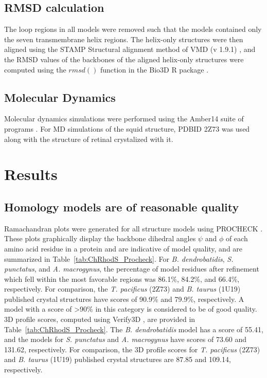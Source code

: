 \subsection*{RMSD calculation}
The loop regions in all models were removed such that the models contained only the seven transmembrane helix regions. The helix-only structures were then aligned using the STAMP Structural alignment method \cite{Russell1992} of VMD (v 1.9.1) \cite{Humphrey1996}, and the RMSD values of the backbones of the aligned helix-only structures were computed using the $rmsd()$ function in the Bio3D R package \cite{Grant2006}.\\
\subsection*{Molecular Dynamics}
Molecular dynamics simulations were performed using the Amber14 suite of programs \cite{AMBER2015}. For MD simulations of the squid structure, PDBID 2Z73 was used along with the structure of retinal crystalized with it. \\
\section{Results}
\subsection*{Homology models are of reasonable quality}
Ramachandran plots were generated for all structure models using PROCHECK \cite{Laskowski1993,Wiederstein2007}. These plots graphically display the backbone dihedral angles $\psi$ and $\phi$ of each amino acid residue in a protein and are indicative of model quality, and are summarized in Table~\ref{tab:ChRhodS_Procheck}. For \textit{B. dendrobatidis}, \textit{S. punctatus}, and \textit{A. macrogynus}, the percentage of model residues after refinement which fell within the most favorable regions was 86.1\%, 84.2\%, and 66.4\%, respectively. For comparison, the \textit{T. pacificus} (2Z73) and \textit{B. taurus} (1U19) published crystal structures have scores of 90.9\% and 79.9\%, respectively. A model with a score of \textgreater 90\% in this category is considered to be of good quality.\\
\indent 3D profile scores, computed using Verify3D \cite{Luthy1992}, are provided in Table~\ref{tab:ChRhodS_Procheck}. The \textit{B. dendrobatidis} model has a score of 55.41, and the models for \textit{S. punctatus} and \textit{A. macrogynus} have scores of 73.60 and 131.62, respectively. For comparison, the 3D profile scores for \textit{T. pacificus} (2Z73) and \textit{B. taurus} (1U19) published crystal structures are 87.85 and 109.14, respectively.
